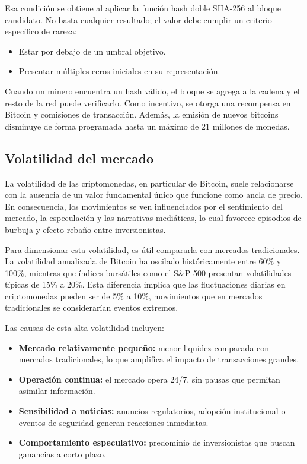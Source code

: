 Esa condición se obtiene al aplicar la función hash doble SHA-256 al
bloque candidato. No basta cualquier resultado; el valor debe cumplir
un criterio específico de rareza:

\begin{itemize}
  \item Estar por debajo de un umbral objetivo.
  \item Presentar múltiples ceros iniciales en su representación.
\end{itemize}

Cuando un minero encuentra un hash válido, el bloque se agrega a la
cadena y el resto de la red puede verificarlo. Como incentivo, se
otorga una recompensa en Bitcoin y comisiones de transacción. Además,
la emisión de nuevos bitcoins disminuye de forma programada hasta un
máximo de 21 millones de monedas.

\subsection{Volatilidad del mercado}

La volatilidad de las criptomonedas, en particular de Bitcoin, suele
relacionarse con la ausencia de un valor fundamental único que funcione
como ancla de precio. En consecuencia, los movimientos se ven
influenciados por el sentimiento del mercado, la especulación y las
narrativas mediáticas, lo cual favorece episodios de burbuja y efecto
rebaño entre inversionistas.

Para dimensionar esta volatilidad, es útil compararla con mercados
tradicionales. La volatilidad anualizada de Bitcoin ha oscilado
históricamente entre 60\% y 100\%, mientras que índices bursátiles
como el S\&P 500 presentan volatilidades típicas de 15\% a 20\%. Esta
diferencia implica que las fluctuaciones diarias en criptomonedas
pueden ser de 5\% a 10\%, movimientos que en mercados tradicionales
se considerarían eventos extremos.

Las causas de esta alta volatilidad incluyen:

\begin{itemize}
  \item \textbf{Mercado relativamente pequeño:} menor liquidez
    comparada con mercados tradicionales, lo que amplifica el impacto
    de transacciones grandes.
  \item \textbf{Operación continua:} el mercado opera 24/7, sin
    pausas que permitan asimilar información.
  \item \textbf{Sensibilidad a noticias:} anuncios regulatorios,
    adopción institucional o eventos de seguridad generan
    reacciones inmediatas.
  \item \textbf{Comportamiento especulativo:} predominio de
    inversionistas que buscan ganancias a corto plazo.
\end{itemize}

